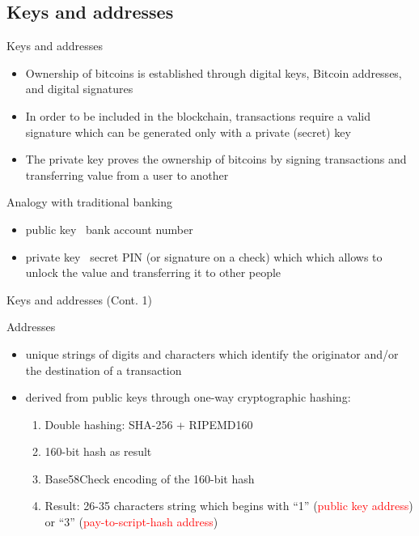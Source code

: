 \documentclass{beamer}
\newcommand\red[1]{\textcolor{red}{#1}}
\begin{document}
  \subsection{Keys and addresses}
  \begin{frame}{Keys and addresses}
    \begin{itemize}
      \item Ownership of bitcoins is established through digital keys, Bitcoin addresses, and digital signatures 
      \item In order to be included in the blockchain, transactions require a valid
      signature which can be generated only with a private (secret) key 
      \item The private key proves the ownership of bitcoins by signing transactions and
      transferring value from a user to another \pause
    \end{itemize}
    \begin{block}{Analogy with traditional banking}
      \begin{itemize}
        \item public key \MVRightarrow\, bank account number
        \item private key \MVRightarrow\, secret PIN (or signature on a check)
        which which allows to unlock the value and transferring it to other people
      \end{itemize}
    \end{block}
  \end{frame}





  \begin{frame}{Keys and addresses (Cont. 1)}
    \begin{block}{Addresses}
      \begin{itemize}
        \item unique strings of digits and characters which identify the originator and/or the destination of a transaction \pause
        \item derived from public keys through one-way cryptographic hashing:
        \begin{enumerate}
          \item Double hashing: SHA-256 + RIPEMD160
          \item 160-bit hash as result
          \item Base58Check encoding of the 160-bit hash
          \item Result: 26-35 characters string which begins with “1” (\red{public key
          address}) or “3” (\red{pay-to-script-hash address})
        \end{enumerate}
      \end{itemize}
    \end{block}
  \end{frame}
\end{document}

